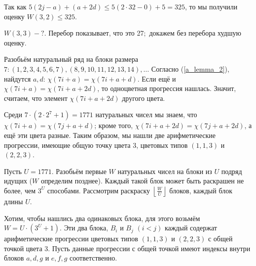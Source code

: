 \documentclass[a4paper]{report}
\begin{document}
{{            Так как $5(2j - a) + (a + 2d) \le 5(2 \cdot 32 - 0) + 5 = 325$, то мы получили оценку $W(3, 2) \le 325$.

            \item $W(3, 3) - ?$. Перебор показывает, что это 27;\ докажем без перебора худшую оценку.

            Разобьём натуральный ряд на блоки размера $7: (1, 2, 3, 4, 5, 6, 7), (8, 9, 10, 11, 12, 13, 14), \ldots$
            Согласно (\cref{a_lemma_2}), найдутся $a, d$: $\chi(7i + a) = \chi(7i + a + d)$.
            Если ещё и $\chi(7i + a) = \chi(7i + a + 2d)$, то одноцветная прогрессия нашлась.
            Значит, считаем, что элемент $\chi(7i + a + 2d)$ другого цвета.

            Среди $7 \cdot (2 \cdot 2^7 + 1) = 1771$ натуральных чисел мы знаем, что $\chi(7i + a) = \chi(7j + a + d)$;
            кроме того, $\chi(7i + a + 2d) = \chi(7j + a + 2d)$, а ещё эти цвета разные.
            Таким образом, мы нашли две арифметические прогрессии, имеющие общую точку цвета $3$, цветовых типов $(1,1,3)$ и $(2,2,3)$.

            Пусть $U = 1771$. Разобьём первые $W$ натуральных чисел на блоки из $U$ подряд идущих ($W$ определим позднее).
            Каждый такой блок может быть раскрашен не более, чем $3^U$ способами.
            Рассмотрим раскраску $\left\lfloor \frac{W}{U} \right\rfloor$ блоков, каждый блок длины $U$.

            Хотим, чтобы нашлись два одинаковых блока, для этого возьмём $W = U \cdot (3^U + 1)$.
            Эти два блока, $B_i$ и $B_j$ $(i < j)$ каждый содержат арифметические прогрессии цветовых типов $(1,1,3)$ и $(2,2,3)$ с общей точкой цвета $3$.
            Пусть данные прогрессии с общей точкой имеют индексы внутри блоков $a, d, g$ и $e, f, g$ соответственно.

}}
\end{document}
